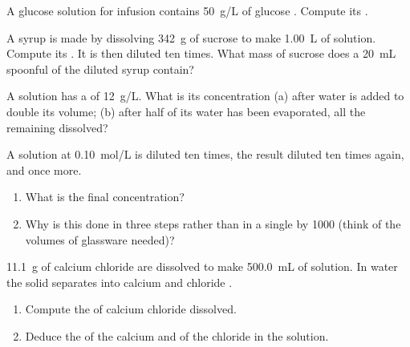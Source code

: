 \begin{exercise}[$\star\star$]\label{exo:g10:concentration-and-dilution:9}
A glucose solution for infusion contains \qty{50}{g/L} of glucose
. Compute its .
\end{exercise}

\begin{exercise}[$\star\star$]\label{exo:g10:concentration-and-dilution:10}
A syrup is made by dissolving \qty{342}{g} of sucrose  to
make \qty{1.00}{L} of solution. Compute its . It is
then diluted ten times. What mass of sucrose does a \qty{20}{mL} spoonful
of the diluted syrup contain?
\end{exercise}

\begin{exercise}[$\star\star$]\label{exo:g10:concentration-and-dilution:11}
A solution has a  of \qty{12}{g/L}. What is its
concentration (a) after water is added to double its volume; (b) after
half of its water has been evaporated, all the  remaining
dissolved?
\end{exercise}

\begin{exercise}[$\star\star\star$]\label{exo:g10:concentration-and-dilution:12}
A solution at \qty{0.10}{mol/L} is diluted ten times, the result diluted
ten times again, and once more.
\begin{enumerate}
  \item What is the final concentration?
  \item Why is this done in three steps rather than in a single 
        by 1000 (think of the volumes of glassware needed)?
\end{enumerate}
\end{exercise}

\begin{exercise}[$\star\star\star$]\label{exo:g10:concentration-and-dilution:13}
\qty{11.1}{g} of calcium chloride  are dissolved to make
\qty{500.0}{mL} of solution. In water the solid separates into calcium
  and chloride  .
\begin{enumerate}
  \item Compute the  of calcium chloride dissolved.
  \item Deduce the  of the calcium  and of the
        chloride  in the solution.
\end{enumerate}
\end{exercise}

